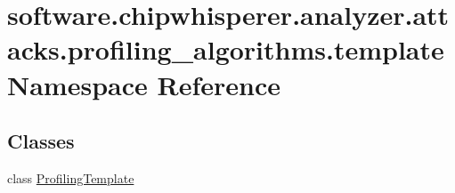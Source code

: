 \hypertarget{namespacesoftware_1_1chipwhisperer_1_1analyzer_1_1attacks_1_1profiling__algorithms_1_1template}{}\section{software.\+chipwhisperer.\+analyzer.\+attacks.\+profiling\+\_\+algorithms.\+template Namespace Reference}
\label{namespacesoftware_1_1chipwhisperer_1_1analyzer_1_1attacks_1_1profiling__algorithms_1_1template}
\subsection*{Classes}
\begin{DoxyCompactItemize}
\item 
class \hyperlink{classsoftware_1_1chipwhisperer_1_1analyzer_1_1attacks_1_1profiling__algorithms_1_1template_1_1ProfilingTemplate}{Profiling\+Template}
\end{DoxyCompactItemize}
